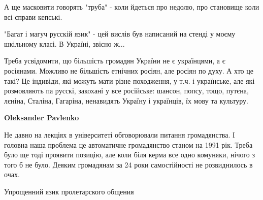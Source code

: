 \begin{itemize}

А ще масковити говорять "труба" - коли йдеться про недолю, про становище коли
всі справи кепські.

\begin{itemize} %
"Багат і магуч русскій язик" - цей вислів був написаний на стенді у моєму шкільному класі. В Україні, звісно ж...
\end{itemize} %


Треба усвідомити, що більшість громадян України не є українцями, а є росіянами.
Можливо не більшість етнічних росіян, але росіян по духу. А хто це такі? Це
індивіди, які можуть мати різне походження, у т.ч. і українське, але які
розмовляють па русскі, закохані у все російське: шансон, попсу, тощо, путєна,
лєніна, Сталіна, Гагаріна, ненавидять Україну і українців, їх мову та культуру.

\begin{itemize} %
\textbf{Oleksander Pavlenko} 

Не давно на лекціях в університеті обговорювали питання громадянства. І головна
наша проблема це автоматичне громадянство станом на 1991 рік. Треба було ще
тоді проявити позицію, але коли біля керма все одно комуняки, нічого з того б
не було. Деяким громадянам за 24 роки самостійності не розвиднилось в очах.

\end{itemize} %


Упрощенний язик пролетарского общения


\end{itemize} %
